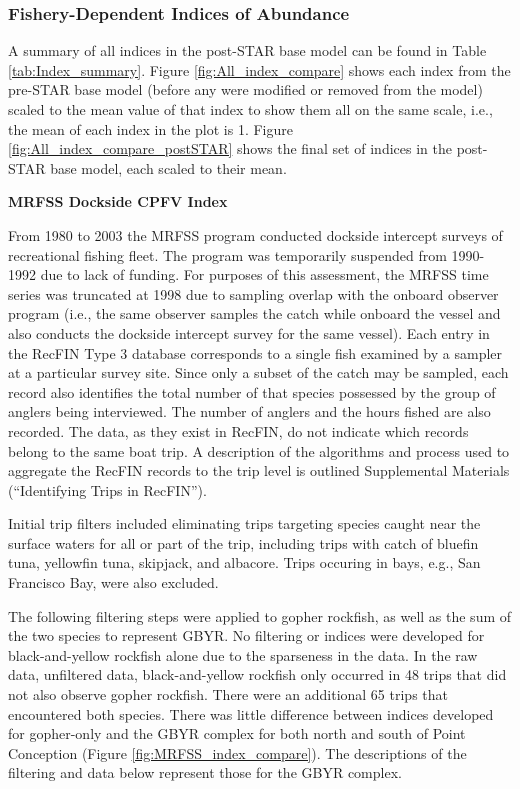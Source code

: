 \documentclass[12pt,]{article}
\begin{document}
\subsubsection{Fishery-Dependent Indices of
Abundance}\label{fishery-dependent-indices-of-abundance}

A summary of all indices in the post-STAR base model can be found in
Table \ref{tab:Index_summary}. Figure \ref{fig:All_index_compare} shows
each index from the pre-STAR base model (before any were modified or
removed from the model) scaled to the mean value of that index to show
them all on the same scale, i.e., the mean of each index in the plot is
1. Figure \ref{fig:All_index_compare_postSTAR} shows the final set of
indices in the post-STAR base model, each scaled to their mean.

\textbf{MRFSS Dockside CPFV Index}

From 1980 to 2003 the MRFSS program conducted dockside intercept surveys
of recreational fishing fleet. The program was temporarily suspended
from 1990-1992 due to lack of funding. For purposes of this assessment,
the MRFSS time series was truncated at 1998 due to sampling overlap with
the onboard observer program (i.e., the same observer samples the catch
while onboard the vessel and also conducts the dockside intercept survey
for the same vessel). Each entry in the RecFIN Type 3 database
corresponds to a single fish examined by a sampler at a particular
survey site. Since only a subset of the catch may be sampled, each
record also identifies the total number of that species possessed by the
group of anglers being interviewed. The number of anglers and the hours
fished are also recorded. The data, as they exist in RecFIN, do not
indicate which records belong to the same boat trip. A description of
the algorithms and process used to aggregate the RecFIN records to the
trip level is outlined Supplemental Materials (``Identifying Trips in
RecFIN'').

Initial trip filters included eliminating trips targeting species caught
near the surface waters for all or part of the trip, including trips
with catch of bluefin tuna, yellowfin tuna, skipjack, and albacore.
Trips occuring in bays, e.g., San Francisco Bay, were also excluded.

The following filtering steps were applied to gopher rockfish, as well
as the sum of the two species to represent GBYR. No filtering or indices
were developed for black-and-yellow rockfish alone due to the sparseness
in the data. In the raw data, unfiltered data, black-and-yellow rockfish
only occurred in 48 trips that did not also observe gopher rockfish.
There were an additional 65 trips that encountered both species. There
was little difference between indices developed for gopher-only and the
GBYR complex for both north and south of Point Conception (Figure
\ref{fig:MRFSS_index_compare}). The descriptions of the filtering and
data below represent those for the GBYR complex.
\end{document}
